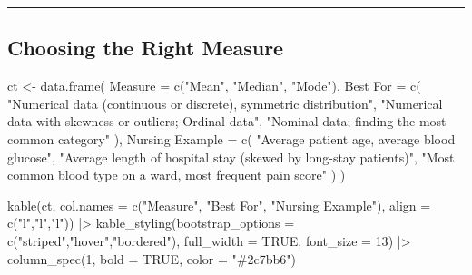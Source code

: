 \documentclass[
  12pt,
  letterpaper,
]{book}
\newenvironment{Shaded}{\begin{snugshade}}{\end{snugshade}}
\newcommand{\AttributeTok}[1]{\textcolor[rgb]{0.40,0.45,0.13}{#1}}
\newcommand{\ConstantTok}[1]{\textcolor[rgb]{0.56,0.35,0.01}{#1}}
\newcommand{\DecValTok}[1]{\textcolor[rgb]{0.68,0.00,0.00}{#1}}
\newcommand{\FunctionTok}[1]{\textcolor[rgb]{0.28,0.35,0.67}{#1}}
\newcommand{\NormalTok}[1]{\textcolor[rgb]{0.00,0.23,0.31}{#1}}
\newcommand{\OtherTok}[1]{\textcolor[rgb]{0.00,0.23,0.31}{#1}}
\newcommand{\SpecialCharTok}[1]{\textcolor[rgb]{0.37,0.37,0.37}{#1}}
\newcommand{\StringTok}[1]{\textcolor[rgb]{0.13,0.47,0.30}{#1}}
\begin{document}
\begin{center}\rule{0.5\linewidth}{0.5pt}\end{center}

\subsection{Choosing the Right
Measure}\label{choosing-the-right-measure}

\begin{Shaded}
\begin{Highlighting}[]
\NormalTok{ct }\OtherTok{\textless{}{-}} \FunctionTok{data.frame}\NormalTok{(}
  \AttributeTok{Measure =} \FunctionTok{c}\NormalTok{(}\StringTok{"Mean"}\NormalTok{, }\StringTok{"Median"}\NormalTok{, }\StringTok{"Mode"}\NormalTok{),}
  \StringTok{\textasciigrave{}}\AttributeTok{Best For}\StringTok{\textasciigrave{}} \OtherTok{=} \FunctionTok{c}\NormalTok{(}
    \StringTok{"Numerical data (continuous or discrete), symmetric distribution"}\NormalTok{,}
    \StringTok{"Numerical data with skewness or outliers; Ordinal data"}\NormalTok{,}
    \StringTok{"Nominal data; finding the most common category"}
\NormalTok{  ),}
  \StringTok{\textasciigrave{}}\AttributeTok{Nursing Example}\StringTok{\textasciigrave{}} \OtherTok{=} \FunctionTok{c}\NormalTok{(}
    \StringTok{"Average patient age, average blood glucose"}\NormalTok{,}
    \StringTok{"Average length of hospital stay (skewed by long{-}stay patients)"}\NormalTok{,}
    \StringTok{"Most common blood type on a ward, most frequent pain score"}
\NormalTok{  )}
\NormalTok{)}

\FunctionTok{kable}\NormalTok{(ct, }\AttributeTok{col.names =} \FunctionTok{c}\NormalTok{(}\StringTok{"Measure"}\NormalTok{, }\StringTok{"Best For"}\NormalTok{, }\StringTok{"Nursing Example"}\NormalTok{),}
      \AttributeTok{align =} \FunctionTok{c}\NormalTok{(}\StringTok{"l"}\NormalTok{,}\StringTok{"l"}\NormalTok{,}\StringTok{"l"}\NormalTok{)) }\SpecialCharTok{|\textgreater{}}
  \FunctionTok{kable\_styling}\NormalTok{(}\AttributeTok{bootstrap\_options =} \FunctionTok{c}\NormalTok{(}\StringTok{"striped"}\NormalTok{,}\StringTok{"hover"}\NormalTok{,}\StringTok{"bordered"}\NormalTok{),}
                \AttributeTok{full\_width =} \ConstantTok{TRUE}\NormalTok{, }\AttributeTok{font\_size =} \DecValTok{13}\NormalTok{) }\SpecialCharTok{|\textgreater{}}
  \FunctionTok{column\_spec}\NormalTok{(}\DecValTok{1}\NormalTok{, }\AttributeTok{bold =} \ConstantTok{TRUE}\NormalTok{, }\AttributeTok{color =} \StringTok{"\#2c7bb6"}\NormalTok{)}
\end{Highlighting}
\end{Shaded}
\end{document}
